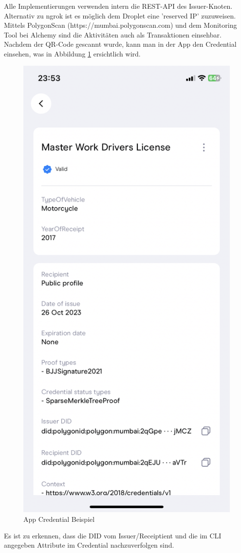\begin{itemize}
	Alle Implementierungen verwenden intern die REST-API des Issuer-Knoten. Alternativ zu ngrok ist es möglich dem Droplet eine 'reserved IP' zuzuweisen. Mittels PolygonScan (https://mumbai.polygonscan.com) und dem Monitoring Tool bei Alchemy sind die Aktivitäten auch als Transaktionen einsehbar. Nachdem der QR-Code gescannt wurde, kann man in der App den Credential einsehen, was in Abbildung \ref{fig:appCredential} ersichtlich wird.
	 \begin{figure}[H]
	 	\centering
	 	\includegraphics[scale=0.2]{media/appCredential}
	 	\caption{App Credential Beispiel}
	 	\label{fig:appCredential}
	 \end{figure}
	 
	 Es ist zu erkennen, dass die DID vom Issuer/Receiptient und die im CLI angegeben Attribute im Credential nachzuverfolgen sind.
	\end{itemize}
	 
